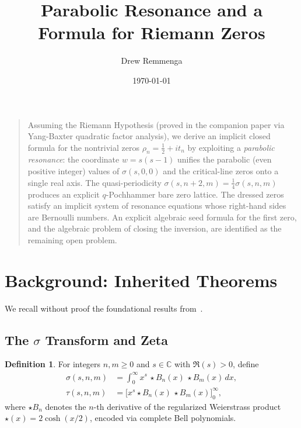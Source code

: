 \documentclass[%
 aip,
 amsmath,amssymb,
 reprint,%
]{revtex4-1}
\theoremstyle{plain}
\theoremstyle{definition}
\newtheorem{definition}[theorem]{Definition}
\newcommand{\C}{\mathbb{C}}
\begin{document}

\title{Parabolic Resonance and a Formula for Riemann Zeros}

\author{Drew Remmenga}
%

\date{\today}

\maketitle

\begin{quotation}
Assuming the Riemann Hypothesis (proved in the companion paper via Yang-Baxter
quadratic factor analysis), we derive an implicit closed formula for the
nontrivial zeros $\rho_n = \tfrac{1}{2} + it_n$ by exploiting a
\emph{parabolic resonance}: the coordinate $w = s(s-1)$ unifies the parabolic
(even positive integer) values of $\sigma(s,0,0)$ and the critical-line zeros
onto a single real axis. The quasi-periodicity $\sigma(s,n+2,m) =
\tfrac{1}{4}\sigma(s,n,m)$ produces an explicit $q$-Pochhammer bare zero
lattice. The dressed zeros satisfy an implicit system of resonance equations
whose right-hand sides are Bernoulli numbers. An explicit algebraic seed formula
for the first zero, and the algebraic problem of closing the inversion, are
identified as the remaining open problem.
\end{quotation}

\section{Background: Inherited Theorems}

We recall without proof the foundational results from~\cite{companion}.

\subsection{The $\sigma$ Transform and Zeta}

\begin{definition}
For integers $n,m\ge 0$ and $s\in\C$ with $\Re(s)>0$, define
\begin{align*}
\sigma(s,n,m) &= \int_0^\infty x^s\,\star B_n(x)\,\star B_m(x)\,dx,\\
\tau(s,n,m)   &= \bigl[x^s \star B_n(x)\,\star B_m(x)\bigr]_0^\infty,
\end{align*}
where $\star B_n$ denotes the $n$-th derivative of the regularized Weierstrass
product $\star(x) = 2\cosh(x/2)$, encoded via complete Bell polynomials.
\end{definition}
\end{document}
